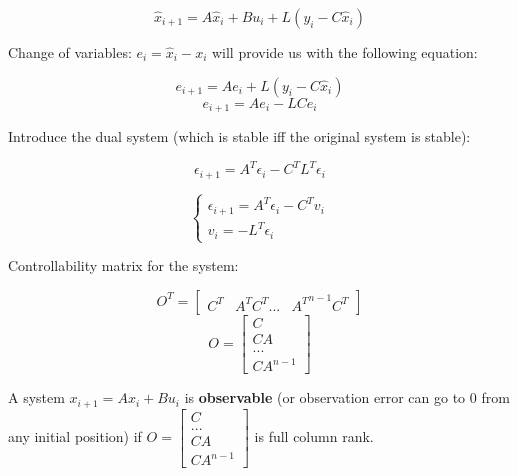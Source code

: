 \[
\hat{x}_{i+1} = A\hat{x}_i + Bu_i + L(y_i - C \hat{x}_i)
\]

Change of variables: $e_i = \hat{x}_i - x_i$ will provide us with the following equation:

\[
e_{i+1} = Ae_i + L(y_i - C \hat{x}_i)
\]
\[
e_{i+1} = Ae_i - LCe_i
\]

Introduce the dual system (which is stable iff the original system is stable):

\[
\epsilon_{i+1} = A^T\epsilon_i - C^T L^T\epsilon_i
\]

\[
\begin{cases}
    \epsilon_{i+1} = A^T \epsilon_i - C^T v_i \\
    v_i = - L^T \epsilon_i
\end{cases}
\]

Controllability matrix for the system:

\[O^T = \begin{bmatrix} C^T & A^T C^T ... & {A^T}^{n-1} C^T \end{bmatrix}\]
\[O = \begin{bmatrix} C \\ CA \\ ... \\ CA^{n-1} \end{bmatrix} \]



\begin{tcolorbox}[colback=green!10,colframe=green!50!black,title=\textbf{Observability}]
    A system $x_{i+1} = Ax_i + Bu_i$ is \textbf{observable} (or observation error can go to 0 from any initial position) if $O = \begin{bmatrix} C \\ ... \\CA \\ CA^{n-1} \end{bmatrix}$
    is full column rank.
\end{tcolorbox}



















